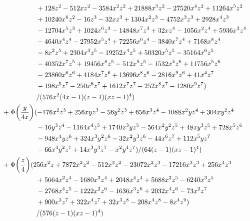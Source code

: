 \documentclass[letter,11pt,DIV=12,abstract=true,numbers=noenddot,titlepage=false,twocolumn=false,draft=false]{scrartcl}
\begin{document}
\begin{equation}
\begin{split}
      & \qquad \qquad \qquad + 128 z^2 - 512 x z^2 - 3584 x^2 z^2 + 21888 x^3 z^2 - 27520 x^4 z^2 + 11264 x^5 z^2\\
      & \qquad \qquad \qquad + 10240 x^6 z^2 - 16 z^3 - 32 x z^3 + 1304 x^2 z^3 - 4752 x^3 z^3 + 2928 x^4 z^3\\
      & \qquad \qquad \qquad - 12704 x^5 z^3 + 1024 x^6 z^3 - 14848 x^7 z^3 + 32 x z^4 - 1056 x^2 z^4 + 5936 x^3 z^4\\
      & \qquad \qquad \qquad - 4640 x^4 z^4 - 27952 x^5 z^4 + 72256 x^6 z^4 - 3840 x^7 z^4 + 7168 x^8 z^4\\
      & \qquad \qquad \qquad - 8 x^2 z^5 + 2304 x^3 z^5 - 19252 x^4 z^5 + 50320 x^5 z^5 - 35164 x^6 z^5\\
      & \qquad \qquad \qquad - 40352 x^7 z^5 + 19456 x^8 z^5 - 512 x^9 z^5 - 1532 x^4 z^6 + 11756 x^5 z^6\\
      & \qquad \qquad \qquad - 23860 x^6 z^6 + 4184 x^7 z^6 + 13696 x^8 z^6 - 2816 x^9 z^6 + 41 x^4 z^7\\
      & \qquad \qquad \qquad - 198 x^5 z^7 - 250 x^6 z^7 + 1612 x^7 z^7 - 252 x^8 z^7 - 1280 x^9 z^7)\\
      & \qquad \qquad \qquad /(576 x^2 (4x-1) (z-1) (x z-1)^4)\\
& \quad + \Phi\bigg(\frac{y}{4x}\bigg) (-176 x^2 z^3 + 256 x y z^3 - 56 y^2 z^3 + 656 x^3 z^4 - 1088 x^2 y z^4 + 304 x y^2 z^4\\
      & \qquad \qquad \qquad - 16 y^3 z^4 - 1164 x^4 z^5 + 1740 x^3 y z^5 - 564 x^2 y^2 z^5 + 48 x y^3 z^5 + 728 x^5 z^6\\
      & \qquad \qquad \qquad - 948 x^4 y z^6 + 324 x^3 y^2 z^6 - 32 x^2 y^3 z^6 - 44 x^6 z^7 + 112 x^5 y z^7\\
      & \qquad \qquad \qquad - 66 x^4 y^2 z^7 + 14 x^3 y^3 z^7 - 
    x^2 y^4 z^7) /(64 (z-1) (x z-1)^4)\\
& \quad + \Phi\bigg(\frac{z}{4}\bigg) (256 x^2 z + 7872 x^2 z^2 - 512 x^3 z^2 - 23072 x^2 z^3 - 17216 x^3 z^3 + 256 x^4 z^3\\
      & \qquad \qquad \qquad + 5664 x^2 z^4 - 1680 x^3 z^4 + 2048 x^4 z^4 + 5688 x^2 z^5 - 6240 x^3 z^5\\
      & \qquad \qquad \qquad - 2768 x^4 z^5 - 1222 x^2 z^6 - 1636 x^3 z^6 + 2032 x^4 z^6 - 73 x^2 z^7\\
      & \qquad \qquad \qquad + 900 x^3 z^7 + 322 x^4 z^7 + 32 x^3 z^8 - 208 x^4 z^8 - 8 x^4 z^9)\\
      & \qquad \qquad \qquad /(576 (z-1) (x z-1)^4)\\
\notag
\end{split}
\end{equation}
\end{document}
